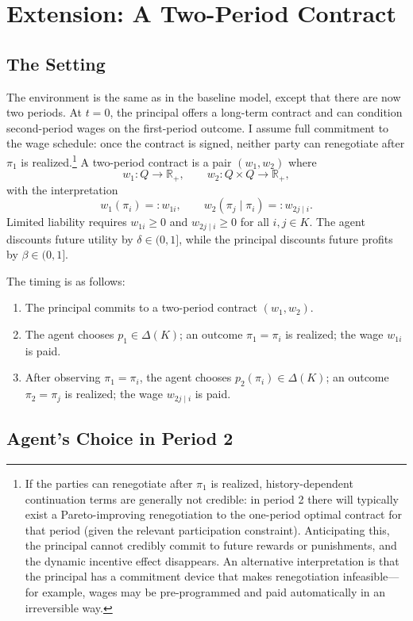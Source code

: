 \documentclass[12pt]{article}
\theoremstyle{definition}
\begin{document}
\section{Extension: A Two-Period Contract}
\subsection{The Setting}

The environment is the same as in the baseline model, except that there are now two periods. At \(t=0\), the principal offers a long-term contract and can condition second-period wages on the first-period outcome.
I assume full commitment to the wage schedule: once the contract is signed, neither party can renegotiate after \(\pi_1\) is realized.\footnote{If the parties can renegotiate after \(\pi_1\) is realized, history-dependent
continuation terms are generally not credible: in period 2 there will typically exist a Pareto-improving renegotiation to the one-period optimal
contract for that period (given the relevant participation constraint). Anticipating this, the principal cannot credibly commit to future rewards or punishments, and the dynamic incentive effect disappears.
An alternative interpretation is that the principal has a commitment device that makes renegotiation infeasible—for example, wages may be pre-programmed and paid automatically in an irreversible way.}
A two-period contract is a pair \((w_1,w_2)\) where
\[
w_1:Q\to\mathbb{R}_+,\qquad w_2:Q\times Q\to\mathbb{R}_+,
\]
with the interpretation
\[
w_1(\pi_i)=:w_{1i},\qquad w_2(\pi_j\mid \pi_i)=:w_{2j\mid i}.
\]
Limited liability requires \(w_{1i}\ge 0\) and \(w_{2j\mid i}\ge 0\) for all \(i,j\in K\). The agent discounts future utility by \(\delta\in(0,1]\), while the principal discounts future profits by \(\beta\in(0,1]\).

The timing is as follows:
\begin{enumerate}
\item[\(t=0\):] The principal commits to a two-period contract \((w_1,w_2)\).
\item[\textbf{Period 1:}] The agent chooses \(p_1\in\Delta(K)\); an outcome \(\pi_1=\pi_i\) is realized; the wage \(w_{1i}\) is paid.
\item[\textbf{Period 2:}] After observing \(\pi_1=\pi_i\), the agent chooses \(p_2(\pi_i)\in\Delta(K)\); an outcome \(\pi_2=\pi_j\) is realized; the wage \(w_{2j\mid i}\) is paid.
\end{enumerate}

\subsection{Agent's Choice in Period 2}
\end{document}
